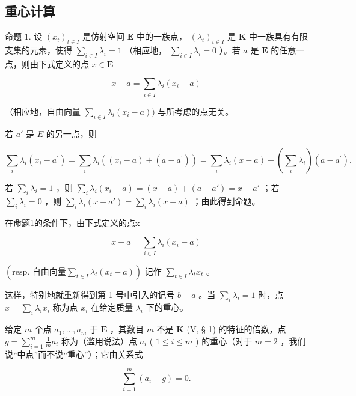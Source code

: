 \subsection{重心计算}

命题 1. 设 \((x_{t})_{t\in I}\) 是仿射空间 \(\mathbf{E}\) 中的一族点， \((\lambda_t)_{t\in I}\) 是 \(\mathbf{K}\) 中一族具有有限支集的元素，使得 \(\sum_{i\in I}\lambda_i = 1\) （相应地， \(\sum_{i\in I}\lambda_i = 0\) ）。若 \(a\) 是 \(\mathbf{E}\) 的任意一点，则由下式定义的点 \(x\in \mathbf{E}\)

\[
x - a = \sum_ {i \in I} \lambda_ {i} (x _ {i} - a)
\]

（相应地，自由向量 \(\sum_{i\in I}\lambda_i(x_i - a))\) 与所考虑的点无关。

若 \(a'\) 是 \(E\) 的另一点，则

\[
\sum_ {i} \lambda_ {i} (x _ {i} - a ^ {\prime}) = \sum_ {i} \lambda_ {i} ((x _ {i} - a) + (a - a ^ {\prime})) = \sum_ {i} \lambda_ {i} (x - a) + \left(\sum_ {i} \lambda_ {i}\right) (a - a ^ {\prime}).
\]

若 \(\sum_{i}\lambda_{i} = 1\) ，则 \(\sum_{i}\lambda_{i}(x_{i} - a) = (x - a) + (a - a') = x - a'\) ；若 \(\sum_{i}\lambda_{i} = 0\) ，则 \(\sum_{i}\lambda_{i}(x - a') = \sum_{i}\lambda_{i}(x - a)\) ；由此得到命题。

在命题1的条件下，由下式定义的点x

\[
x - a = \sum_ {i \in I} \lambda_ {i} (x _ {i} - a)
\]

\(\left(\text{resp. 自由向量} \sum_{t \in I} \lambda_t(x_t - a)\right)\) 记作 \(\sum_{t \in I} \lambda_t x_t\) 。

这样，特别地就重新得到第 1 号中引入的记号 \(b - a\) 。当 \(\sum_{i} \lambda_{i} = 1\) 时，点 \(x = \sum_{i} \lambda_{i} x_{i}\) 称为点 \(x_{i}\) 在给定质量 \(\lambda_{i}\) 下的重心。

给定 \(m\) 个点 \(a_1, \ldots, a_m\) 于 \(\mathbf{E}\) ，其数目 \(m\) 不是 \(\mathbf{K}\) (V, § 1) 的特征的倍数，点 \(g = \sum_{i=1}^{m} \frac{1}{m} a_i\) 称为（滥用说法）点 \(a_i\) ( \(1 \leqslant i \leqslant m\) ) 的重心（对于 \(m = 2\) ，我们说“中点”而不说“重心”）；它由关系式

\[
\sum_ {i = 1} ^ {m} \left(a _ {i} - g\right) = 0.
\]

